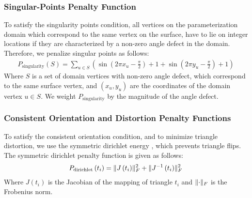 \subsubsection{Singular-Points Penalty Function}
To satisfy the singularity points condition, all vertices on the parameterization domain which correspond to the same vertex on the surface, have to lie on integer locations if they are characterized by a non-zero angle defect in the domain. Therefore, we penalize singular points as follows:
\begin{multline}
P_{\mathrm{singularity}}\left(S\right) = \sum_{u \in S} \left( \sin\left(2 \pi x_{u} - \frac{\pi}{2} \right) + 1 + \sin\left(2 \pi y_{u} - \frac{\pi}{2} \right) + 1 \right) \nonumber
\end{multline}
Where $S$ is a set of domain vertices with non-zero angle defect, which correspond to the same surface vertex, and $\left(x_u,y_u\right)$ are the coordinates of the domain vertex $u \in S$. We weight $P_{\mathrm{singularity}}$ by the magnitude of the angle defect.
\subsubsection{Consistent Orientation and Distortion Penalty Functions}
To satisfy the consistent orientation condition, and to minimize triangle distortion, we use the symmetric dirichlet energy \cite{10.1145/2766947}, which prevents triangle flips. The symmetric dirichlet penalty function is given as follows:
$$
P_{\mathrm{dirichlet}}\left(t_i\right) = \lVert J\left(t_i\right)\rVert_F^2 + \lVert J^{-1}\left(t_i\right)\rVert_F^2 \nonumber
$$
Where $J\left(t_i\right)$ is the Jacobian of the mapping of triangle $t_i$ and $\lVert\cdot\rVert_F$ is the Frobenius norm.
